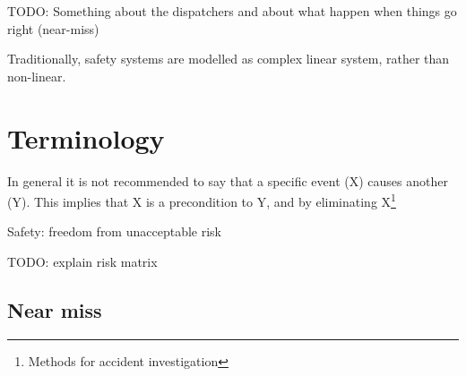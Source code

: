 
TODO: Something about the dispatchers and about what happen when things go right (near-miss)








Traditionally, safety systems are modelled as complex linear system, rather than non-linear.

\chapter{Terminology}
In general it is not recommended to say that a specific event (X) causes another (Y). This implies that X is a precondition to Y, and by eliminating X\footnote{Methods for accident investigation}

Safety: freedom from unacceptable risk

TODO: explain risk matrix

\section{Near miss}

